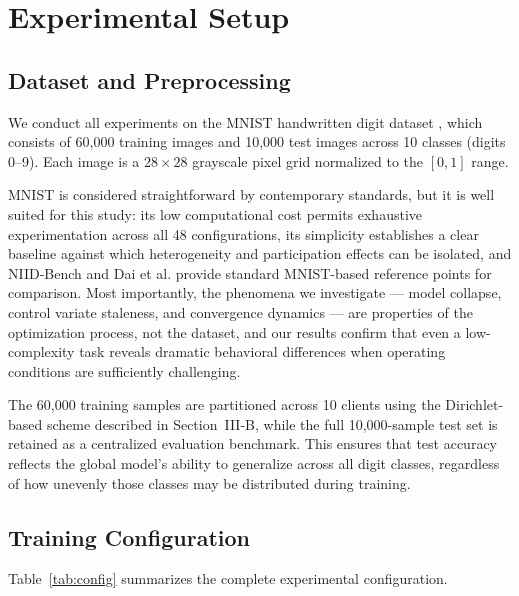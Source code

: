 \documentclass[conference]{IEEEtran}
\begin{document}
\section{Experimental Setup}

\subsection{Dataset and Preprocessing}

We conduct all experiments on the MNIST handwritten digit dataset \cite{lecun1998mnist}, which consists of 60,000 training images and 10,000 test images across 10 classes (digits 0--9). Each image is a $28 \times 28$ grayscale pixel grid normalized to the $[0, 1]$ range.

MNIST is considered straightforward by contemporary standards, but it is well suited for this study: its low computational cost permits exhaustive experimentation across all 48 configurations, its simplicity establishes a clear baseline against which heterogeneity and participation effects can be isolated, and NIID-Bench \cite{li2022niid} and Dai et al. \cite{dai2024empirical} provide standard MNIST-based reference points for comparison. Most importantly, the phenomena we investigate --- model collapse, control variate staleness, and convergence dynamics --- are properties of the optimization process, not the dataset, and our results confirm that even a low-complexity task reveals dramatic behavioral differences when operating conditions are sufficiently challenging.

The 60,000 training samples are partitioned across 10 clients using the Dirichlet-based scheme described in Section~III-B, while the full 10,000-sample test set is retained as a centralized evaluation benchmark. This ensures that test accuracy reflects the global model's ability to generalize across all digit classes, regardless of how unevenly those classes may be distributed during training.

\subsection{Training Configuration}

Table~\ref{tab:config} summarizes the complete experimental configuration.
\end{document}

